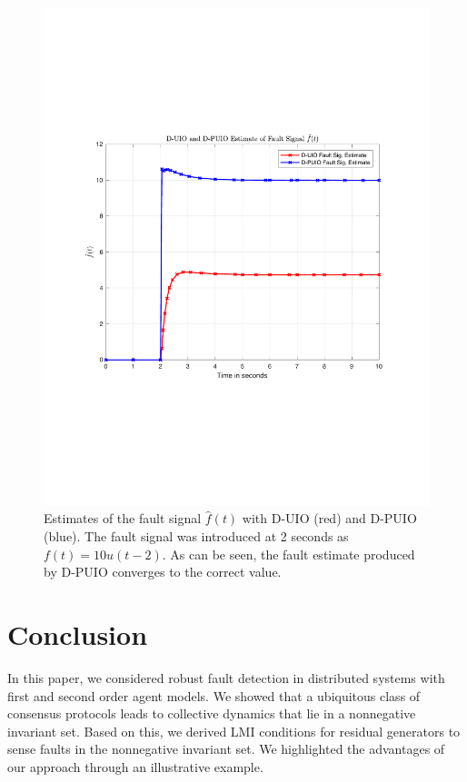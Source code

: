 \documentclass[letterpaper, 10 pt, conference]{ieeeconf}  %
\begin{document}
 \begin{figure}
    \centering
    \includegraphics[scale=0.3]{faultEstim}
    \caption{Estimates of the fault signal $\hat{f}(t)$ with D-UIO (red) and D-PUIO (blue). The fault signal was introduced at 2 seconds as $f(t) =10u(t-2)$. As can be seen, the fault estimate produced by D-PUIO converges to the correct value. }
    \label{fig:faultEstim}
\end{figure}
\section{Conclusion} \label{sec:con}
In this paper, we considered robust fault detection in distributed systems with first and second order agent models. We showed that a ubiquitous class of consensus protocols leads to collective dynamics that lie in a nonnegative invariant set. Based on this, we derived LMI conditions for residual generators to sense faults in the nonnegative invariant set. We highlighted the advantages of our approach through an illustrative example.



\end{document}

